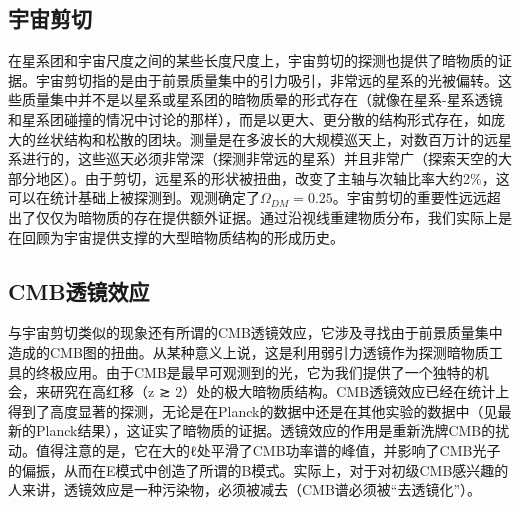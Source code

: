 \subsection{宇宙剪切}
在星系团和宇宙尺度之间的某些长度尺度上，宇宙剪切的探测也提供了暗物质的证据。宇宙剪切指的是由于前景质量集中的引力吸引，非常远的星系的光被偏转。这些质量集中并不是以星系或星系团的暗物质晕的形式存在（就像在星系-星系透镜和星系团碰撞的情况中讨论的那样），而是以更大、更分散的结构形式存在，如庞大的丝状结构和松散的团块。测量是在多波长的大规模巡天上，对数百万计的远星系进行的，这些巡天必须非常深（探测非常远的星系）并且非常广（探索天空的大部分地区）。由于剪切，远星系的形状被扭曲，改变了主轴与次轴比率大约2\%，这可以在统计基础上被探测到。观测确定了$\Omega_{DM} = 0.25$。宇宙剪切的重要性远远超出了仅仅为暗物质的存在提供额外证据。通过沿视线重建物质分布，我们实际上是在回顾为宇宙提供支撑的大型暗物质结构的形成历史。
\subsection{CMB透镜效应}
与宇宙剪切类似的现象还有所谓的CMB透镜效应，它涉及寻找由于前景质量集中造成的CMB图的扭曲。从某种意义上说，这是利用弱引力透镜作为探测暗物质工具的终极应用。由于CMB是最早可观测到的光，它为我们提供了一个独特的机会，来研究在高红移（z ≳ 2）处的极大暗物质结构。CMB透镜效应已经在统计上得到了高度显著的探测，无论是在Planck的数据中还是在其他实验的数据中（见最新的Planck结果），这证实了暗物质的证据。透镜效应的作用是重新洗牌CMB的扰动。值得注意的是，它在大的ℓ处平滑了CMB功率谱的峰值，并影响了CMB光子的偏振，从而在E模式中创造了所谓的B模式。实际上，对于对初级CMB感兴趣的人来讲，透镜效应是一种污染物，必须被减去（CMB谱必须被“去透镜化”）。


